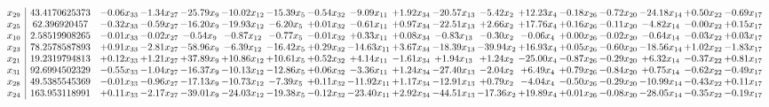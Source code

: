 \documentclass[9pt]{article}
\begin{document}
 \[\begin{array}{c| c c@{\hskip 2pt} c@{\hskip 2pt} c@{\hskip 2pt} c@{\hskip 2pt} c@{\hskip 2pt} c@{\hskip 2pt} c@{\hskip 2pt} c@{\hskip 2pt} c@{\hskip 2pt} c@{\hskip 2pt} c@{\hskip 2pt} c@{\hskip 2pt} c@{\hskip 2pt} c@{\hskip 2pt} c@{\hskip 2pt} c@{\hskip 2pt} }
 x_{29}   &  43.4170625373 & -0.06 x_{33} & -1.34 x_{27} & -25.79 x_{9} & -10.02 x_{12} & -15.39 x_{5} & -0.54 x_{32} & -9.09 x_{11} & +  1.92 x_{34} & -20.57 x_{13} & -5.42 x_{2} & + 12.23 x_{4} & -0.18 x_{26} & -0.72 x_{20} & -24.18 x_{14} & +  0.50 x_{22} & -0.69 x_{17}\\
 x_{25}   &  62.396920457 & -0.32 x_{33} & -0.59 x_{27} & -16.20 x_{9} & -19.93 x_{12} & -6.20 x_{5} & +  0.01 x_{32} & -0.61 x_{11} & +  0.97 x_{34} & -22.51 x_{13} & +  2.66 x_{2} & + 17.76 x_{4} & +  0.16 x_{26} & -0.11 x_{20} & -4.82 x_{14} & -0.00 x_{22} & +  0.15 x_{17}\\
 x_{10}   &  2.58519908265 & -0.01 x_{33} & -0.02 x_{27} & -0.54 x_{9} & -0.87 x_{12} & -0.77 x_{5} & -0.01 x_{32} & +  0.33 x_{11} & +  0.08 x_{34} & -0.83 x_{13} & -0.30 x_{2} & -0.06 x_{4} & +  0.00 x_{26} & -0.02 x_{20} & -0.64 x_{14} & -0.03 x_{22} & +  0.03 x_{17}\\
 x_{23}   &  78.2578587893 & +  0.91 x_{33} & -2.81 x_{27} & -58.96 x_{9} & -6.39 x_{12} & -16.42 x_{5} & +  0.29 x_{32} & -14.63 x_{11} & +  3.67 x_{34} & -18.39 x_{13} & -39.94 x_{2} & + 16.93 x_{4} & +  0.05 x_{26} & -0.60 x_{20} & -18.56 x_{14} & +  1.02 x_{22} & -1.83 x_{17}\\
 x_{21}   &  19.2319794813 & +  0.12 x_{33} & +  1.21 x_{27} & + 37.89 x_{9} & + 10.86 x_{12} & + 10.61 x_{5} & +  0.52 x_{32} & +  4.14 x_{11} & -1.61 x_{34} & +  1.94 x_{13} & +  1.24 x_{2} & -25.00 x_{4} & -0.87 x_{26} & -0.29 x_{20} & +  6.32 x_{14} & -0.37 x_{22} & +  0.81 x_{17}\\
 x_{31}   &  92.6994502329 & -0.55 x_{33} & -1.04 x_{27} & -16.37 x_{9} & -10.13 x_{12} & -12.86 x_{5} & +  0.06 x_{32} & -3.36 x_{11} & +  1.24 x_{34} & -27.40 x_{13} & -2.04 x_{2} & +  6.49 x_{4} & +  0.79 x_{26} & -0.84 x_{20} & +  0.75 x_{14} & -0.62 x_{22} & -0.49 x_{17}\\
 x_{28}   &  49.5385545369 & -0.01 x_{33} & -0.96 x_{27} & -17.13 x_{9} & -10.73 x_{12} & -7.39 x_{5} & +  0.11 x_{32} & -11.92 x_{11} & +  1.17 x_{34} & -12.91 x_{13} & +  0.79 x_{2} & -4.04 x_{4} & -0.50 x_{26} & -0.29 x_{20} & -10.99 x_{14} & -0.43 x_{22} & +  0.11 x_{17}\\
 x_{24}   &  163.953118991 & +  0.11 x_{33} & -2.17 x_{27} & -39.01 x_{9} & -24.03 x_{12} & -19.38 x_{5} & -0.12 x_{32} & -23.40 x_{11} & +  2.92 x_{34} & -44.51 x_{13} & -17.36 x_{2} & + 19.89 x_{4} & +  0.01 x_{26} & -0.08 x_{20} & -28.05 x_{14} & -0.35 x_{22} & -0.19 x_{17}\\

\end{array}\]
\end{document}
